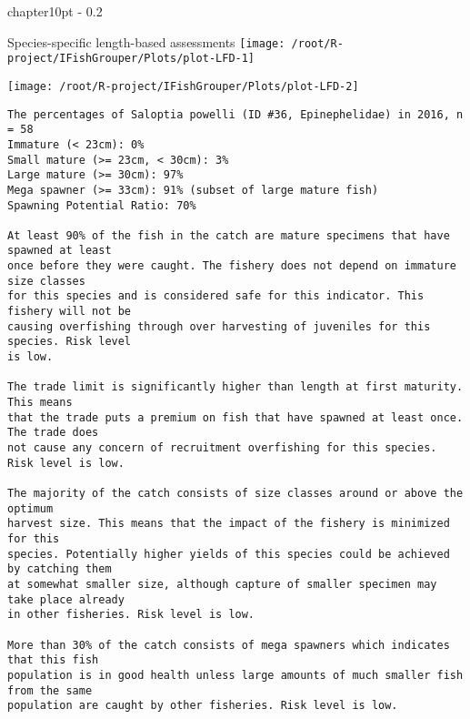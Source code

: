 \documentclass{report}\usepackage[]{graphicx}\usepackage[]{color}
\makeatletter
\def\maxwidth{ %
  \ifdim\Gin@nat@width>\linewidth
    \linewidth
  \else
    \Gin@nat@width
  \fi
}
\newenvironment{kframe}{%
 \def\at@end@of@kframe{}%
 \ifinner\ifhmode%
  \def\at@end@of@kframe{\end{minipage}}%
  \begin{minipage}{\columnwidth}%
 \fi\fi%
 \def\FrameCommand##1{\hskip\@totalleftmargin \hskip-\fboxsep
 \colorbox{shadecolor}{##1}\hskip-\fboxsep
     \hskip-\linewidth \hskip-\@totalleftmargin \hskip\columnwidth}%
 \MakeFramed {\advance\hsize-\width
   \@totalleftmargin\z@ \linewidth\hsize
   \@setminipage}}%
 {\par\unskip\endMakeFramed%
 \at@end@of@kframe}
\newenvironment{knitrout}{}{} %
\newcommand{\verbatimfont}[1]{\def\verbatim@font{#1}}%
\renewcommand\chapter{\@startsection%
{chapter}{1}{0pt}%
{-\baselineskip}%
{0.2\baselineskip}%
{\raggedright\bf}}%
\makeatother
\begin{document}
%
%

\newpage

\chapter{Species-specific length-based assessments}
\verbatimfont{\normalfont\rmfamily}
\begin{knitrout}
\color{fgcolor}
\texttt{[image: /root/R-project/IFishGrouper/Plots/plot-LFD-1]} 

\texttt{[image: /root/R-project/IFishGrouper/Plots/plot-LFD-2]} 
\begin{kframe}\begin{verbatim}
The percentages of Saloptia powelli (ID #36, Epinephelidae) in 2016, n = 58
Immature (< 23cm): 0%
Small mature (>= 23cm, < 30cm): 3%
Large mature (>= 30cm): 97%
Mega spawner (>= 33cm): 91% (subset of large mature fish)
Spawning Potential Ratio: 70%
 
At least 90% of the fish in the catch are mature specimens that have spawned at least
once before they were caught. The fishery does not depend on immature size classes
for this species and is considered safe for this indicator. This fishery will not be
causing overfishing through over harvesting of juveniles for this species. Risk level
is low.

The trade limit is significantly higher than length at first maturity.  This means
that the trade puts a premium on fish that have spawned at least once. The trade does
not cause any concern of recruitment overfishing for this species. Risk level is low.

The majority of the catch consists of size classes around or above the optimum
harvest size. This means that the impact of the fishery is minimized for this
species. Potentially higher yields of this species could be achieved by catching them
at somewhat smaller size, although capture of smaller specimen may take place already
in other fisheries. Risk level is low.

More than 30% of the catch consists of mega spawners which indicates that this fish
population is in good health unless large amounts of much smaller fish from the same
population are caught by other fisheries. Risk level is low.
 

\end{verbatim}
\end{kframe}
\end{knitrout}
\end{document}
